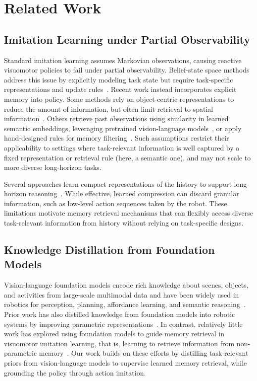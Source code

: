 \section{Related Work}

\subsection{Imitation Learning under Partial Observability}
Standard imitation learning assumes Markovian observations, causing reactive visuomotor policies to fail under partial observability. Belief-state space methods address this issue by explicitly modeling task state but require task-specific representations and update rules~\cite{aastrom1965optimal}.
Recent work instead incorporates explicit memory into policy. Some methods rely on object-centric representations to reduce the amount of information, but often limit retrieval to spatial information~\cite{sam2act}. Others retrieve past observations using similarity in learned semantic embeddings, leveraging pretrained vision-language models~\cite{clipnav,okrobot}, or apply hand-designed rules for memory filtering~\cite{memer}.
Such assumptions restrict their applicability to settings where task-relevant information is well captured by a fixed representation or retrieval rule (here, a semantic one), and may not scale to more diverse long-horizon tasks.

Several approaches learn compact representations of the history to support long-horizon reasoning~\cite{fang2019scene}. While effective, learned compression can discard granular information, such as low-level action sequences taken by the robot. These limitations motivate memory retrieval mechanisms that can flexibly access diverse task-relevant information from history without relying on task-specific designs.

\subsection{Knowledge Distillation from Foundation Models}
Vision-language foundation models encode rich knowledge about scenes, objects, and activities from large-scale multimodal data and have been widely used in robotics for perception, planning, affordance learning, and semantic reasoning~\cite{shridhar2022cliport,song2023llm,ahn2022can,gu2023rt,nasiriany2025rt,shah2025bumble}.
Prior work has also distilled knowledge from foundation models into robotic systems by improving parametric representations~\cite{zhou2025chatvla,driess2025knowledge}. In contrast, relatively little work has explored using foundation models to guide memory retrieval in visuomotor imitation learning, that is, learning to retrieve information from non-parametric memory~\cite{lewis2020retrieval}. Our work builds on these efforts by distilling task-relevant priors from vision-language models to supervise learned memory retrieval, while grounding the policy through action imitation.

